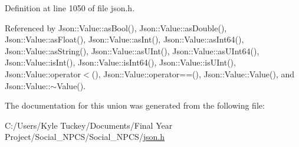 Definition at line 1050 of file json.\+h.



Referenced by Json\+::\+Value\+::as\+Bool(), Json\+::\+Value\+::as\+Double(), Json\+::\+Value\+::as\+Float(), Json\+::\+Value\+::as\+Int(), Json\+::\+Value\+::as\+Int64(), Json\+::\+Value\+::as\+String(), Json\+::\+Value\+::as\+U\+Int(), Json\+::\+Value\+::as\+U\+Int64(), Json\+::\+Value\+::is\+Int(), Json\+::\+Value\+::is\+Int64(), Json\+::\+Value\+::is\+U\+Int(), Json\+::\+Value\+::operator$<$(), Json\+::\+Value\+::operator==(), Json\+::\+Value\+::\+Value(), and Json\+::\+Value\+::$\sim$\+Value().



The documentation for this union was generated from the following file\+:\begin{DoxyCompactItemize}
\item 
C\+:/\+Users/\+Kyle Tuckey/\+Documents/\+Final Year Project/\+Social\+\_\+\+N\+P\+C\+S/\+Social\+\_\+\+N\+P\+C\+S/\hyperlink{json_8h}{json.\+h}\end{DoxyCompactItemize}
